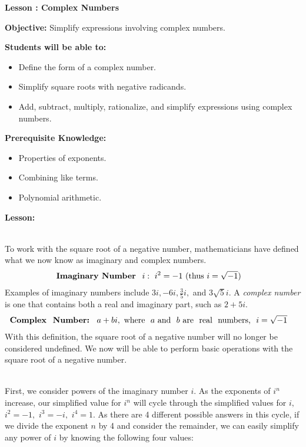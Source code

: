 \documentclass[12pt]{article}
\theoremstyle{definition}
\begin{document}
{\bf \large Lesson : Complex Numbers}%
\hfill \doclicenseImage[imagewidth=5em]\\
\par
{\bf Objective:} Simplify expressions involving complex numbers.\\
\par
{\bf Students will be able to:}
\begin{itemize}
	\item Define the form of a complex number.
	\item Simplify square roots with negative radicands.
	\item Add, subtract, multiply, rationalize, and simplify expressions using complex numbers.
\end{itemize}
{\bf Prerequisite Knowledge:}
\begin{itemize}
	\item Properties of exponents.
	\item Combining like terms.
	\item Polynomial arithmetic.
\end{itemize}
\hrulefill

{\bf Lesson:}\\
\ \par
To work with the square root of a negative number, mathematicians have defined what we now know as imaginary and complex numbers.
\begin{eqnarray*}
  \text{{\bf Imaginary\ Number \ }} i:~ i^2
  = - 1~ (\text{thus\ } i = \sqrt{- 1}) &  & 
\end{eqnarray*}
Examples of imaginary numbers include $3 i, - 6 i, \frac{3}{5} i,$ and $3 \sqrt{5}i$. A {\it complex number} is one that contains both a real and imaginary part, such as $2 + 5 i$.
\begin{eqnarray*}
  \text{{\bf Complex \ Number: \ }} a+bi, \text{\ where \ } a \text{\ and \ } b \text{\ are \ real \ numbers, \ } i = \sqrt{- 1} &  & 
\end{eqnarray*}
With this definition, the square root of a negative number will no longer be considered undefined. We now will be able to perform basic operations with the square root of a negative number.\\
\ \par
First, we consider powers of the imaginary number $i$.
As the exponents of $i^n$ increase, our simplified value for $i^n$ will cycle through the simplified values for $i,$ $i^2=- 1,$ $i^3= - i,$ $i^4=1$. As there are 4 different possible answers in this
cycle, if we divide the exponent $n$ by 4 and consider the remainder, we can easily simplify any power of $i$ by knowing the following four values:
\end{document}
